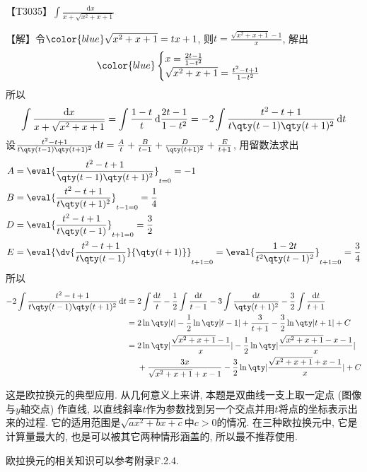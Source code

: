 \documentclass{ctexbook}
\newcommand*{\dif}{\mathop{}\!\mathrm{d}}
\begin{document}
{【T3035】$\int\frac{\dif{x}}{x+\sqrt{x^{2}+x+1}}$\par
【解】令$\color{blue}\sqrt{x^{2}+x+1}=tx+1$, 则$t=\frac{\sqrt{x^{2}+x+1}-1}{x}$, 解出
\begin{align*}\color{blue}
\begin{cases}
x=\frac{2t-1}{1-t^{2}}\\
\sqrt{x^{2}+x+1}=\frac{t^{2}-t+1}{1-t^{2}}
\end{cases}
\end{align*}
所以
\begin{align*}
\int\frac{\dif{x}}{x+\sqrt{x^{2}+x+1}}=\int\frac{1-t}{t}\dif{\frac{2t-1}{1-t^{2}}}=-2\int\frac{t^{2}-t+1}{t\qty(t-1)\qty(t+1)^{2}}\dif{t}
\end{align*}
设$\frac{t^{2}-t+1}{t\qty(t-1)\qty(t+1)^{2}}\dif{t}=\frac{A}{t}+\frac{B}{t-1}+\frac{D}{\qty(t+1)^{2}}+\frac{E}{t+1}$, 用留数法求出
\begin{align*}
A={}&\eval{\frac{t^{2}-t+1}{\qty(t-1)\qty(t+1)^{2}}}_{t=0}=-1\\
B={}&\eval{\frac{t^{2}-t+1}{t\qty(t+1)^{2}}}_{t-1=0}=\frac{1}{4}\\
D={}&\eval{\frac{t^{2}-t+1}{t\qty(t-1)}}_{t+1=0}=\frac{3}{2}\\
E={}&\eval{\dv{\frac{t^{2}-t+1}{t\qty(t-1)}}{\qty(t+1)}}_{t+1=0}=\eval{\frac{1-2t}{t^{2}\qty(t-1)^{2}}}_{t+1=0}=\frac{3}{4}
\end{align*}
所以
\begin{align*}
-2\int\frac{t^{2}-t+1}{t\qty(t-1)\qty(t+1)^{2}}\dif{t}={}&2\int\frac{\dif{t}}{t}-\frac{1}{2}\int\frac{\dif{t}}{t-1}-3\int\frac{\dif{t}}{\qty(t+1)^{2}}-\frac{3}{2}\int\frac{\dif{t}}{t+1}\\
={}&2\ln\qty|t|-\frac{1}{2}\ln\qty|t-1|+\frac{3}{t+1}-\frac{3}{2}\ln\qty|t+1|+C\\
={}&2\ln\qty|\frac{\sqrt{x^{2}+x+1}-1}{x}|-\frac{1}{2}\ln\qty|\frac{\sqrt{x^{2}+x+1}-x-1}{x}|\\
{}&+\frac{3x}{\sqrt{x^{2}+x+1}+x-1}-\frac{3}{2}\ln\qty|\frac{\sqrt{x^{2}+x+1}+x-1}{x}|+C
\end{align*}\par
{\kaishu 这是欧拉换元的典型应用. 从几何意义上来讲, 本题是双曲线一支上取一定点 (图像与$y$轴交点) 作直线, 以直线斜率$t$作为参数找到另一个交点并用$t$将点的坐标表示出来的过程. 它的适用范围是$\sqrt{ax^{2}+bx+c}$中$c>0$的情况. 在三种欧拉换元中, 它是计算量最大的, 也是可以被其它两种情形涵盖的, 所以最不推荐使用. \par
欧拉换元的相关知识可以参考附录F.2.4. \par}
}
\end{document}
